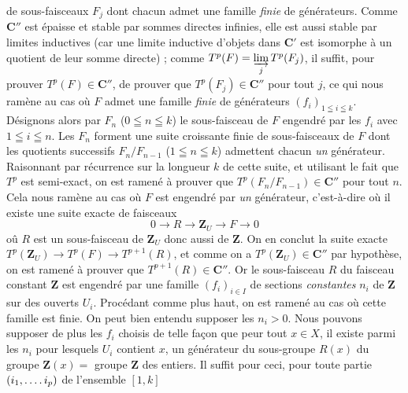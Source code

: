 
\noindent de sous-faisceaux $F_j$ dont chacun admet une famille \textit{finie}
de générateurs.
Comme $\mathbf C''$ est épaisse et stable par sommes directes infinies, elle est aussi
stable par limites inductives (car une limite inductive d'objets dans $\mathbf C'$ est
isomorphe à un quotient de leur somme directe) ; comme
$T^p(F)=\varinjlim\limits_j T^p(F_j)$,
il suffit, pour prouver $T^p(F)\in \mathbf C''$, de prouver que
$T^p(F_j)\in \mathbf C''$ pour tout $j$, ce qui nous ramène au cas où $F$ admet une
famille \textit{finie} de générateurs $(f_i)_{1\leqq i\leqq k}$.
Désignons alors par $F_n$ ($0\leqq n\leqq k$) le sous-faisceau de $F$ engendré
par les $f_i$ avec $1\leqq i\leqq n$. Les $F_n$ forment une suite croissante
finie de sous-faisceaux de $F$ dont les quotients successifs
$F_n/F_{n-1}$ ($1\leqq n\leqq k$) admettent chacun \textit{un} générateur.
Raisonnant par récurrence sur la longueur $k$ de cette suite, et utilisant le
fait que $T^p$ est semi-exact, on est ramené à prouver que
$T^p(F_n/F_{n-1})\in \mathbf C''$ pour tout $n$.
Cela nous ramène au cas où $F$ est engendré par \textit{un} générateur,
c'est-à-dire où il existe une suite exacte de faisceaux
\[
0\to R\to \mathbf Z_U\to F\to0
\]
oû $R$ est un sous-faisceau de $\mathbf Z_U$ donc aussi de $\mathbf Z$. On en conclut la suite
exacte
$T^p(\mathbf Z_U)\to T^p(F)\to T^{p+1}(R)$,
et comme on a $T^p(\mathbf Z_U)\in \mathbf C''$ par hypothèse, on est ramené à prouver que
$T^{p+1}(R)\in \mathbf C''$.
Or le sous-faisceau $R$ du faisceau constant $\mathbf Z$ est engendré par une famille
$(f_i)_{i\in I}$ de sections \textit{constantes} $n_i$ de $\mathbf Z$ sur des ouverts
$U_i$. Procédant comme plus haut, on est ramené au cas où cette famille est
finie. On peut bien entendu supposer les $n_i>0$.
Nous pouvons supposer de plus les $f_i$ choisis de telle façon que peur tout
$x\in X$, il existe parmi les $n_i$ pour lesquels $U_i$ contient $x$, un
générateur du sous-groupe $R(x)$ du groupe $\mathbf Z(x)={}$ groupe $\mathbf Z$ des entiers.
Il suffit pour ceci, pour toute partie $(i_1,\mathinner{.\,.\,.\,.}i_p)$ de l'ensemble $[1,k]$
